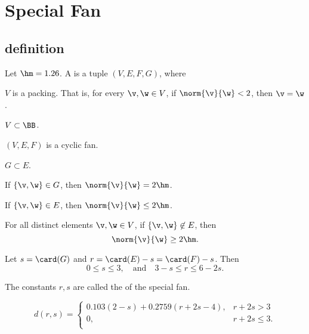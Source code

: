 \section{Special Fan}\label{sec:weight}  






\subsection{definition}

\begin{definition}
Let $\hm = 1.26$.
A  is a tuple $(V,E,F,G)$, where
\begin{nomerate}
\item {} $V$ is a packing.  That is, for every $\v,\w\in
V$, if $\norm{\v}{\w}<2$, then $\v=\w$.
\item {} $V\subset \BB$.
\item {} $(V,E,F)$ is a cyclic fan.
\item {} $G\subset E$.
\item {} If $\{\v,\w\}\in G$, then $\norm{\v}{\w}=2\hm$.
\item {} If $\{\v,\w\}\in E$, then $\norm{\v}{\w}\le 2\hm$.
\item {} For all distinct elements $\v,\w\in V$, if
$\{\v,\w\}\not\in E$, then \begin{displaymath}\norm{\v}{\w}\ge
2\hm.\end{displaymath}
\item {} %
Let      $s=\card(G)$ and $r=\card(E) - s = \card(F)-s$.  Then
\begin{displaymath}0\le s \le 3,\quad\text{and}\quad3-s \le r \le 6 -
2s.\end{displaymath}
\end{nomerate}
The constants $r,s$ are called the  of the special
fan.
\end{definition}


\begin{definition}[d]
\begin{displaymath}d(r,s) = \begin{cases}
0.103 (2-s) + 0.2759 (r+2s-4), & r + 2s > 3\\
0, & r + 2s \le 3.\\
\end{cases}\end{displaymath}
\end{definition}

